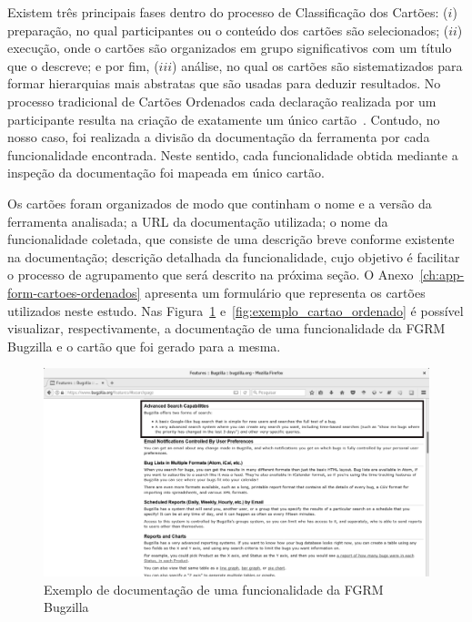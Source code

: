 Existem três principais fases dentro do processo de Classificação dos Cartões:
($i$) preparação, no qual participantes ou o conteúdo dos cartões são selecionados;
($ii$) execução, onde o cartões são organizados em grupo significativos com um
título que o descreve; e por fim, ($iii$) análise, no qual os cartões são
sistematizados para formar hierarquias mais abstratas que são usadas para
deduzir resultados. No processo tradicional de Cartões Ordenados cada declaração
realizada por um participante resulta na criação de exatamente um único
cartão~\cite{just2008towards}. Contudo, no nosso caso, foi realizada a divisão
da documentação da ferramenta por cada funcionalidade encontrada. Neste sentido,
cada funcionalidade obtida mediante a inspeção da documentação foi mapeada em
único cartão.

Os cartões foram organizados de modo que continham o nome e a versão da
ferramenta analisada; a URL da documentação utilizada; o nome da funcionalidade
coletada, que consiste de uma descrição breve conforme existente na
documentação; descrição detalhada da funcionalidade, cujo objetivo é facilitar o
processo de agrupamento que será descrito na próxima seção. O
Anexo~\ref{ch:app-form-cartoes-ordenados} apresenta um formulário que representa
os cartões utilizados neste estudo. Nas Figura~\ref{fig:documentacao_bugzilla}
e~\ref{fig:exemplo_cartao_ordenado} é possível visualizar, respectivamente, a
documentação de uma funcionalidade da FGRM Bugzilla e o cartão que foi gerado
para a mesma.

\begin{figure}[htpb]
	\centering
	\includegraphics[width=0.6\linewidth]{./chapter-estudo-funcionalidades-fgrm/img/documentacao_bugzilla.png}
	\caption{Exemplo de documentação de uma funcionalidade da FGRM Bugzilla}
\label{fig:documentacao_bugzilla}
\end{figure}


